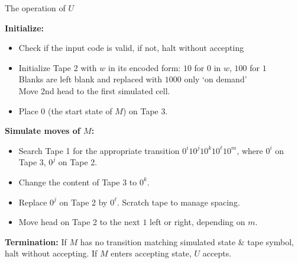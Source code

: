 \documentclass[handout]{beamer}
\begin{document}
\begin{frame}{The operation of $U$}

    \small
    \vspace{-3pt}
    \textbf{Initialize:}
    \vspace{-9pt}
    \begin{itemize}
        \item Check if the input code is valid, if not, halt without accepting
        \item Initialize Tape 2 with $w$ in its encoded form: $10$ for $0$ in $w$, $100$ for $1$\\ 
        Blanks are left blank and replaced with $1000$ only `on demand'\\ 
        Move 2nd head to the first simulated cell. 
        \item Place $0$ (the start state of $M$) on Tape 3.
    \end{itemize}
    \vspace{-3pt}
    \textbf{Simulate moves of $M$:}
    \vspace{-9pt}
    \begin{itemize}
            \item Search Tape 1 for the appropriate transition $0^i10^j10^k10^\ell10^m$, where $0^i$ on Tape 3, $0^j$ on Tape 2.
            \item Change the content of Tape 3 to $0^k$.
            \item Replace $0^j$ on Tape 2 by $0^\ell$. Scratch tape to manage spacing.
            \item Move head on Tape 2 to the next $1$ left or right, depending on $m$.
    \end{itemize}
    \vspace{-3pt}
    \textbf{Termination:} If $M$ has no transition matching simulated state \& tape symbol, halt without accepting. If $M$ enters accepting state, $U$ accepts.

\end{frame}
\end{document}
